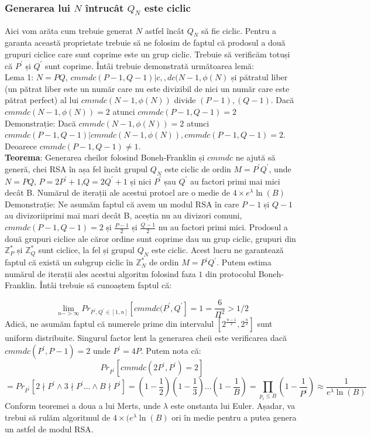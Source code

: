 \documentclass[12]{article}
\begin{document}
\subsubsection{Generarea lui $N$ întrucât $Q_N$ este ciclic}
Aici vom arăta cum trebuie generat $N$ astfel încât $Q_N$ să fie ciclic. Pentru a garanta această proprietate trebuie să ne folosim de faptul că prodosul a două grupuri ciclice care sunt coprime este un grup ciclic. Trebuie să verificăm totuși că $P^{'}$ și $Q^{'}$ sunt coprime. Întâi trebuie demonstrată următoarea lemă: \\
Lema 1: $N=PQ$, $cmmdc(P-1,Q-1)|c,,dc(N-1,\phi(N)$ și pătratul liber (un pătrat liber este un număr care nu este divizibil de nici un număr care este pătrat perfect) al lui $cmmdc(N-1,\phi(N))$ divide $(P-1),(Q-1)$. Dacă $cmmdc(N-1,\phi(N))=2$ atunci $cmmdc(P-1,Q-1)=2$ \\
Demonstrație: Dacă $cmmdc(N-1,\phi(N))=2$ atunci $cmmdc(P-1,Q-1)|cmmdc(N-1,\phi(N)), cmmdc(P-1,Q-1)=2$. Deoarece $cmmdc(P-1,Q-1) \neq 1$.\\
\textbf{Teorema}: Generarea cheilor folosind Boneh-Franklin și $cmmdc$ ne ajută să generă, chei RSA în așa fel încât grupul $Q_N$ este ciclic de ordin $M=P^{'}Q^{'}$, unde $N=PQ$, $P=2P^{'}+1$,$Q=2Q^{'}+1$ și nici $P^{'}$ șau $Q^{'}$ au factori primi mai mici decât B. Numărul de iterații ale acestui protocl are o medie de $ 4 \times e^{\lambda} \ln(B)$ \\
Demonstrație: Ne asumăm faptul că avem un modul RSA în care $P-1$ și $Q-1$ au divizoriiprimi mai mari decât B, aceștia nu au divizori comuni, $cmmdc(P-1,Q-1) = 2$ și $\frac{P-1}{2}$ și $\frac{Q-1}{2}$ nu au factori primi mici. Prodosul a două grupuri ciclice ale căror ordine sunt coprime dau un grup ciclic, grupuri din $\mathbb{Z}_{P}^{*}$ și $\mathbb{Z}_{Q}^{*}$ sunt ciclice, la fel și grupul $Q_N$ este ciclic. Acest lucru ne garantează faptul că există un subgrup ciclic în $\mathbb{Z}_{N}^{*}$ de ordin $M=P^{'}Q^{'}$. Putem estima numărul de iterații ales acestui algoritm folosind faza $1$ din protocolul Boneh-Franklin. Întâi trebuie să cunoaștem faptul că:

$$\lim_{n-> \infty} Pr_{P^{'},Q^{'}  \in [1,n] } [cmmdc(P^{'},Q^{'}]= 1 =  \frac{6}{\Pi^{2}} > 1/2 $$ 
Adică, ne asumăm faptul că numerele prime din intervalul $ \left[  2^{\frac{n-1}{2}}, 2^{\frac{n}{2}}         \right] $ sunt uniform distribuite. Singurul factor lent la generarea cheii este verificarea dacă $cmmdc(P^{'},P-1)=2$ unde $P^{'} = 4P$. Putem nota că:
$$Pr_{P^{'}}[ cmmdc(2P^{'},P^{'}) =2 ]$$
$$ = Pr_{P^{'}} [2 \nmid P^{'} \wedge 3 \nmid P^{'} ...   \wedge B \nmid P^{'} ] =(1- \frac{1}{2})(1 - \frac{1}{3})...(1- \frac{1}{B}) = \prod_{p_i \leqslant B}^{} (1- \frac{1}{P^i}) \approx \frac{1}{e^{\lambda} \ln(B)}  $$
Conform teoremei a doua a lui Merts, unde $\lambda$ este onstanta lui Euler. Așadar, va trebui să rulăm algoritmul de $ 4 \times (e^{\lambda} \ln(B)$ ori în medie pentru a putea genera un astfel de modul RSA. 
\end{document}
